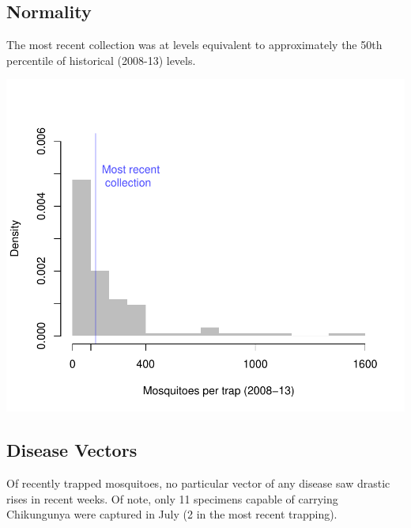 \documentclass{article}
\begin{document}
\begin{multicols}{2} 


\vfill
\columnbreak
\subsection*{Normality}
The most recent collection was at levels equivalent to approximately the 50th percentile of historical (2008-13) levels.

\includegraphics{mosquitoReport-004}

\vfill
\columnbreak



\subsection*{Disease Vectors}

Of recently trapped mosquitoes, no particular vector of any disease saw drastic rises in recent weeks.  Of note, only 11 specimens capable of carrying Chikungunya were captured in July (2 in the most recent trapping). 


\end{multicols}
\end{document}
